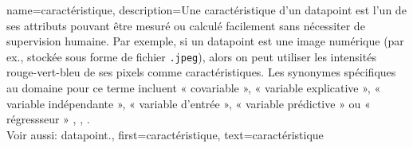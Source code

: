{name={caractéristique},
	description={Une caractéristique d’un \gls{datapoint} est l’un de ses attributs pouvant être mesuré ou calculé facilement sans nécessiter de supervision humaine. Par exemple, si un \gls{datapoint} est une image numérique (par ex., stockée sous forme de fichier \texttt{.jpeg}), alors on peut utiliser les intensités rouge-vert-bleu de ses pixels comme caractéristiques.  
		Les synonymes spécifiques au domaine pour ce terme incluent « covariable », « variable explicative », « variable indépendante », « variable d’entrée », « variable prédictive » ou « régressseur » \cite{Gujarati2021}, \cite{Dodge2003}, \cite{Everitt2022}. 
		\\
		Voir aussi: \gls{datapoint}.},
	first={caractéristique},
	text={caractéristique}
}

